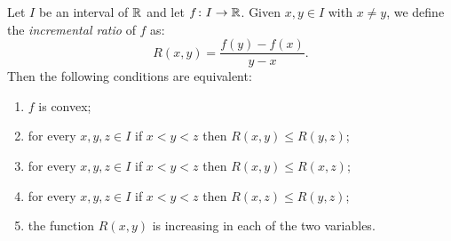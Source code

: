 \begin{lemma}
\mymark{*}%
\label{lemma:547091}%
Let $I$ be an interval of ${\mathbb R}$ and let $f\colon I\to {\mathbb R}$.
Given $x,y\in I$ with $x\neq y$, we define the \emph{incremental ratio}
of $f$ as:
\[
  R(x,y) = \frac{f(y) - f(x)}{y-x}.
\]
Then the following conditions are equivalent:
\begin{enumerate}
\item $f$ is convex;
\item for every $x,y,z\in I$ if $x<y<z$ then $R(x,y)\le R(y,z)$;
\item for every $x,y,z\in I$ if $x<y<z$ then $R(x,y)\le R(x,z)$;
\item for every $x,y,z\in I$ if $x<y<z$ then $R(x,z)\le R(y,z)$;
\item the function $R(x,y)$ is increasing in each of the two variables.
\end{enumerate}
\end{lemma}
%
